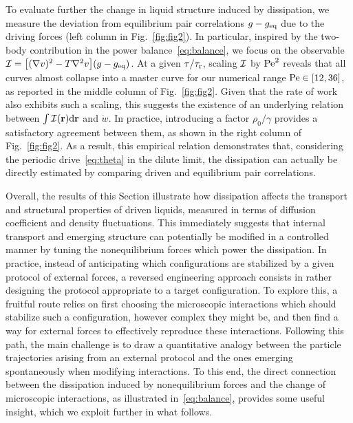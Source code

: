 \documentclass[superscriptaddress, twocolumn, prx, longbibliography, nofootinbib]{revtex4-1}
\begin{document}
To evaluate further the change in liquid structure induced by dissipation, we measure the deviation from equilibrium pair correlations $g-g_{\rm eq}$ due to the driving forces (left column in Fig.~\ref{fig:fig2}). In particular, inspired by the two-body contribution in the power balance~\eqref{eq:balance}, we focus on the observable ${\cal I} = \big[(\nabla v)^2-T\nabla^2v\big](g - g_{\rm eq})$.  At a given $\tau/\tau_{\rm r}$, scaling ${\cal I}$ by ${\rm Pe}^2$ reveals that all curves almost collapse into a master curve for our numerical range ${\rm Pe}\in[12,36]$, as reported in the middle column of Fig.~\ref{fig:fig2}. Given that the rate of work also exhibits such a scaling, this suggests the existence of an underlying relation between $\int{\cal I}({\bf r}){\rm d}{\bf r}$ and $\dot w$. In practice, introducing a factor $\rho_0/\gamma$ provides a satisfactory agreement between them, as shown in the right column of Fig.~\ref{fig:fig2}. As a result, this empirical relation demonstrates that, considering the periodic drive~\eqref{eq:theta} in the dilute limit, the dissipation can actually be directly estimated by comparing driven and equilibrium pair correlations.


Overall, the results of this Section illustrate how dissipation affects the transport and structural properties of driven liquids, measured in terms of diffusion coefficient and density fluctuations. This immediately suggests that internal transport and emerging structure can potentially be modified in a controlled manner by tuning the nonequilibrium forces which power the dissipation. In practice, instead of anticipating which configurations are stabilized by a given protocol of external forces, a reversed engineering approach consists in rather designing the protocol appropriate to a target configuration. To explore this, a fruitful route relies on first choosing the microscopic interactions which should stabilize such a configuration, however complex they might be, and then find a way for external forces to effectively reproduce these interactions. Following this path, the main challenge is to draw a quantitative analogy between the particle trajectories arising from an external protocol and the ones emerging spontaneously when modifying interactions. To this end, the direct connection between the dissipation induced by nonequilibrium forces and the change of microscopic interactions, as illustrated in~\eqref{eq:balance}, provides some useful insight, which we exploit further in what follows.


\end{document}
